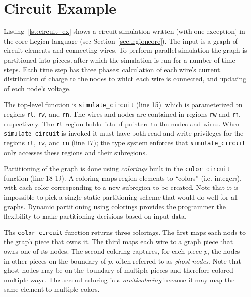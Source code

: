
\section{Circuit Example}
\label{sec:example}

Listing~\ref{lst:circuit_ex} shows a circuit simulation written (with
one exception) in the core Legion language (see
Section~\ref{sec:legioncore}).  The input is a graph of circuit
elements and connecting wires.  To perform parallel
simulation the graph is partitioned into pieces, after which the
simulation is run for a number of time steps.  Each time step has
three phases: calculation of each wire's current, distribution of charge to
the nodes to which each wire is connected, and updating of each node's voltage.

The top-level function is {\tt simulate\_circuit} (line 15), which is
parameterized on regions {\tt rl}, {\tt rw}, and {\tt rn}.
The wires and nodes are contained in regions {\tt rw} and {\tt rn},
respectively.  The {\tt rl} region holds lists of pointers to the nodes and wires.
When {\tt simulate\_circuit} is invoked it must have both read and
write privileges for the regions {\tt rl}, {\tt rw}, and {\tt rn}
(line 17); the type system enforces that
{\tt simulate\_circuit} only accesses these regions and their
subregions.

Partitioning of the graph is done using {\em colorings} built in the
{\tt color\_circuit} function (line 18-19).  A coloring maps region
elements to ``colors'' (i.e. integers), with each color corresponding
 to a new subregion
to be created.  Note that it is impossible to pick a single static
partitioning scheme that would do well for all graphs.  Dynamic
partitioning using colorings provides the programmer the flexibility
to make partitioning decisions based on input data.

The {\tt color\_circuit} function returns three colorings.  The first
maps each node to the graph piece that owns it.
The third maps each wire to a graph piece that
owns one of its nodes.  The second coloring captures, for each piece $p$,
the nodes in other pieces on the boundary of $p$, often referred to as
{\em ghost nodes}.  
Note that 
ghost nodes may be on the boundary of multiple pieces and therefore colored
multiple ways.  The second coloring is a {\em multicoloring} because
it may map the same element to multiple colors.

